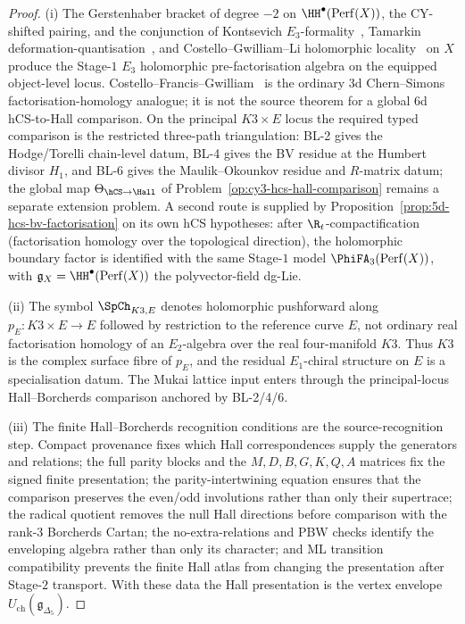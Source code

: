 \begin{proof}
(i) The Gerstenhaber bracket of degree $-2$ on $\HH^\bullet(\mathrm{Perf}(X))$, the CY-shifted pairing, and the conjunction of Kontsevich $E_3$-formality~\cite{Kontsevich1999}, Tamarkin deformation-quantisation~\cite{Tamarkin2007}, and Costello--Gwilliam--Li holomorphic locality~\cite{CostelloGwilliam2017,CostelloLi2016,CostelloLi2020} on $X$ produce the Stage-$1$ $E_3$ holomorphic pre-factorisation algebra on the equipped object-level locus. Costello--Francis--Gwilliam~\cite{CFG2026} is the ordinary $3$d Chern--Simons factorisation-homology analogue; it is not the source theorem for a global $6$d hCS-to-Hall comparison. On the principal $K3\times E$ locus the required typed comparison is the restricted three-path triangulation: BL-2 gives the Hodge/Torelli chain-level datum, BL-4 gives the BV residue at the Humbert divisor $H_1$, and BL-6 gives the Maulik--Okounkov residue and $R$-matrix datum; the global map $\Theta_{\hCS\to\Hall}$ of Problem~\ref{op:cy3-hcs-hall-comparison} remains a separate extension problem. A second route is supplied by Proposition~\ref{prop:5d-hcs-bv-factorisation} on its own hCS hypotheses: after $\R_t$-compactification (factorisation homology over the topological direction), the holomorphic boundary factor is identified with the same Stage-$1$ model $\PhiFA_3(\mathrm{Perf}(X))$, with $\mathfrak{g}_X = \HH^\bullet(\mathrm{Perf}(X))$ the polyvector-field dg-Lie.

(ii) The symbol $\SpCh_{K3,E}$ denotes holomorphic pushforward along
$p_E\colon K3\times E\to E$ followed by restriction to the reference
curve $E$, not ordinary real factorisation homology of an $E_2$-algebra
over the real four-manifold $K3$. Thus $K3$ is the complex surface fibre
of $p_E$, and the residual $E_1$-chiral structure on $E$ is a
specialisation datum. The Mukai lattice input enters through the
principal-locus Hall--Borcherds comparison anchored by BL-2/4/6.

(iii) The finite Hall--Borcherds recognition conditions are the source-recognition step. Compact provenance fixes which Hall correspondences supply the generators and relations; the full parity blocks and the $M,D,B,G,K,Q,A$ matrices fix the signed finite presentation; the parity-intertwining equation ensures that the comparison preserves the even/odd involutions rather than only their supertrace; the radical quotient removes the null Hall directions before comparison with the rank-$3$ Borcherds Cartan; the no-extra-relations and PBW checks identify the enveloping algebra rather than only its character; and ML transition compatibility prevents the finite Hall atlas from changing the presentation after Stage-$2$ transport. With these data the Hall presentation is the vertex envelope $U_{\mathrm{ch}}(\mathfrak{g}_{\Delta_5})$.


\end{proof}
